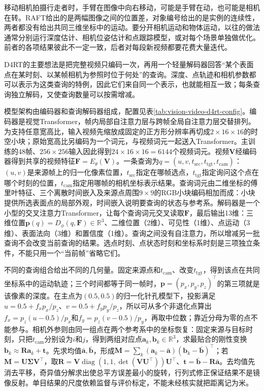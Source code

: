 移动相机拍摄行走者时，手臂在图像中向右移动，可能是手臂在动，也可能是相机在转。RAFT给出的是两幅图像之间的位置差，对象编号给出的是实例的连续性，两者都没有给出共同三维坐标中的运动。要分开相机运动和物体运动，以往的做法通常分别运行深度估计、相机位姿估计和点跟踪模型，或对每个场景单独做优化。前者的各项结果彼此不一定一致，后者对每段新视频都要花费大量迭代。

D4RT的主要想法是把完整视频只编码一次，再用一个轻量解码器回答“某个表面点在某时刻、以某帧相机为参照时位于何处”的查询。深度、点轨迹和相机参数都可以表示为这类查询的特例，因此它们来自同一个表示，也就能相互一致；每条查询独立解码，又使查询数量可以按需增减。

模型架构由编码器和查询解码器组成，配置见表\ref{tab:vision-video-d4rt-config}。编码器是视觉Transformer，帧内局部自注意力层与跨帧全局自注意力层交替排列。为支持任意宽高比，输入视频先缩放成固定的正方形分辨率再切成$2\times16\times16$的时空小块；原始宽高比另编码为一个词元，与视频词元一起送入Transformer。主训练的48帧、$256\times256$输入因此得到$24\times16\times16=6144$个视频词元。视频$\bm{V}$经编码器得到共享的视频特征$\bm{F}=E_\theta(\bm{V})$。一条查询为$q=(u,v,t_{\mathrm{src}},t_{\mathrm{tgt}},t_{\mathrm{cam}})$：$(u,v)$是来源帧上的归一化像素位置，$t_{\mathrm{src}}$指定在哪帧选点，$t_{\mathrm{tgt}}$指定询问这个点在哪个时刻的位置，$t_{\mathrm{cam}}$指定用哪帧的相机坐标表示结果。查询词元由二维坐标的傅里叶特征、三个离散时间嵌入及来源点周围$9\times9$的RGB小块编码相加而成：小块提供所选表面点的局部外观，时间嵌入说明要查询的状态与参考系。解码器是一个小型的交叉注意力Transformer，让每个查询词元交叉读取$\bm{F}$，最后输出13维：三维位置$\bm{p}(q)=D_\phi(q,\bm{F})\in\mathbb{R}^{3}$、二维位置（2维）、可见性（1维）、点运动（3维）、表面法向（3维）和置信度（1维）。查询之间没有自注意力，所以增减另一批查询不会改变当前查询的结果。选点时刻、点状态时刻和坐标系时刻是三项独立条件，不能只用一个“当前帧”省略它们。

不同的查询组合给出不同的几何量。固定来源点和$t_{\mathrm{cam}}$、改变$t_{\mathrm{tgt}}$，得到该点在共同坐标系中的运动轨迹；三个时间都等于同一帧时，$\bm{p}=(p_x,p_y,p_z)^\top$的第三项就是该像素的深度。在主点为$(0.5,0.5)$的归一化针孔模型下，投影满足$u=0.5+f_xp_x/p_z$、$v=0.5+f_yp_y/p_z$，所以可从多个非退化点算出$f_x=p_z(u-0.5)/p_x$和$f_y=p_z(v-0.5)/p_y$，再取中位数；靠近分母为零的点不能参与。相机外参则由同一组点在两个参考系中的坐标恢复：固定来源与目标时刻，只把$t_{\mathrm{cam}}$分别设为$i$和$j$，得到两组对应点$\bm{a}_k,\bm{b}_k\in\mathbb{R}^3$，求最贴合的刚性变换$\bm{b}_k\approx\bm{R}\bm{a}_k+\bm{t}$。先求均值$\bar{\bm{a}},\bar{\bm{b}}$，形成$\bm{M}=\sum_k(\bm{a}_k-\bar{\bm{a}})(\bm{b}_k-\bar{\bm{b}})^\top$；若$\bm{M}=\bm{U}\bm{\Sigma}\bm{V}^{\top}$，取$\bm{R}=\bm{V}\operatorname{diag}(1,1,\det(\bm{V}\bm{U}^{\top}))\bm{U}^{\top}$、$\bm{t}=\bar{\bm{b}}-\bm{R}\bar{\bm{a}}$。去均值先消去平移，奇异值分解求出使总平方误差最小的旋转，行列式修正保证结果不是镜像反射。单目结果的尺度依赖监督与评价标定，不能未经核实就把距离记为米。

